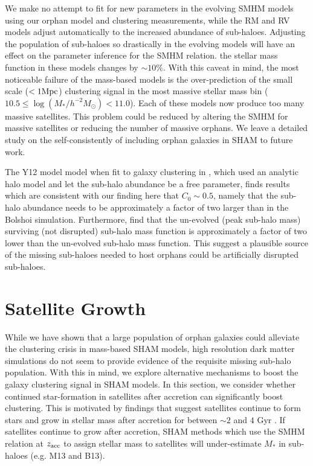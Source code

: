 \documentclass[a4paper,fleqn,usenatbib]{mnras}
\begin{document}
We make no attempt to fit for new parameters in the evolving SMHM models using our orphan model and clustering measurements, while the RM and RV models adjust automatically to the increased abundance of sub-haloes.  Adjusting the population of sub-haloes so drastically in the evolving models will have an effect on the parameter inference for the SMHM relation.  the stellar mass function in these models changes by $\sim 10\%$.  With this caveat in mind, the most noticeable failure of the mass-based models is the over-prediction of the small scale ($< 1 {\rm Mpc}$) clustering signal in the most massive stellar mass bin ($10.5\leq \log(M_*/h^{-2}M_{\odot})<11.0$).  Each of these models now produce too many massive satellites.  This problem could be reduced by altering the SMHM for massive satellites or reducing the number of massive orphans.  We leave a detailed study on the self-consistently of including orphan galaxies in SHAM to future work.

The Y12 model model when fit to galaxy clustering in \cite{Yang:2012ew}, which used an analytic halo model and let the sub-halo abundance be a free parameter, finds results which are consistent with our finding here that $C_0 \sim 0.5$, namely that the sub-halo abundance needs to be approximately a factor of two larger than in the Bolshoi simulation.  Furthermore, \cite{Jiang:2016dw} find that the un-evolved (peak sub-halo mass) surviving (not disrupted) sub-halo mass function is approximately a factor of two lower than the un-evolved sub-halo mass function.  This suggest a plausible source of the missing sub-haloes needed to host orphans could be artificially disrupted sub-haloes.


\section{Satellite Growth}
\label{sec:sat_growth}  

While we have shown that a large population of orphan galaxies could alleviate the clustering crisis in mass-based SHAM models, high resolution dark matter simulations do not seem to provide evidence of the requisite missing sub-halo population.  With this in mind, we explore alternative mechanisms to boost the galaxy clustering signal in SHAM models.  In this section, we consider whether continued star-formation in satellites after accretion can significantly boost clustering.  This is motivated by findings that suggest satellites continue to form stars and grow in stellar mass after accretion for between $\sim 2$ and $4$ Gyr \citep{Wetzel:2013dw}.  If satellites continue to grow after accretion, SHAM methods which use the SMHM relation at $z_{\rm acc}$ to assign stellar mass to satellites will under-estimate $M_*$ in sub-haloes (e.g. M13 and B13).
\end{document}
